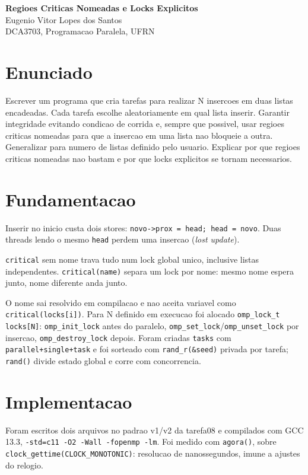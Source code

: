 \documentclass[11pt,letterpaper]{article}
\begin{document}
\pagestyle{plain}
\begin{center}
{\LARGE\bfseries Regioes Criticas Nomeadas e Locks Explicitos}\\[0.4em]
{\normalsize Eugenio Vitor Lopes dos Santos}\\[0.3em]
{\small DCA3703, Programacao Paralela, UFRN}\\[0.3em]
\end{center}
\section{Enunciado}
Escrever um programa que cria tarefas para realizar N insercoes em duas listas encadeadas. Cada tarefa escolhe aleatoriamente em qual lista inserir. Garantir integridade evitando condicao de corrida e, sempre que possivel, usar regioes criticas nomeadas para que a insercao em uma lista nao bloqueie a outra. Generalizar para numero de listas definido pelo usuario. Explicar por que regioes criticas nomeadas nao bastam e por que locks explicitos se tornam necessarios.
\section{Fundamentacao}
Inserir no inicio custa dois stores: \texttt{novo->prox = head; head = novo}. Duas threads lendo o mesmo \texttt{head} perdem uma insercao (\textit{lost update}).

\texttt{critical} sem nome trava tudo num lock global unico, inclusive listas independentes. \texttt{critical(name)} separa um lock por nome: mesmo nome espera junto, nome diferente anda junto.

O nome sai resolvido em compilacao e nao aceita variavel como \texttt{critical(locks[i])}. Para N definido em execucao foi alocado \texttt{omp\_lock\_t locks[N]}: \texttt{omp\_init\_lock} antes do paralelo, \texttt{omp\_set\_lock}/\texttt{omp\_unset\_lock} por insercao, \texttt{omp\_destroy\_lock} depois. Foram criadas \texttt{tasks} com \texttt{parallel+single+task} e foi sorteado com \texttt{rand\_r(\&seed)} privada por tarefa; \texttt{rand()} divide estado global e corre com concorrencia.
\section{Implementacao}
Foram escritos dois arquivos no padrao v1/v2 da tarefa08 e compilados com GCC 13.3, \texttt{-std=c11 -O2 -Wall -fopenmp -lm}. Foi medido com \texttt{agora()}, sobre \texttt{clock\_gettime(CLOCK\_MONOTONIC)}: resolucao de nanossegundos, imune a ajustes do relogio.
\end{document}
